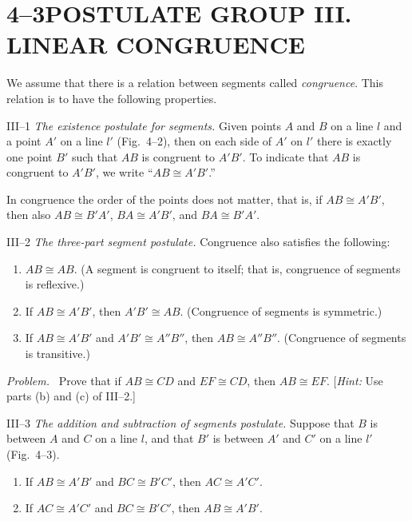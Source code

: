 \documentclass[11pt]{book}
\newenvironment{IVproblem}{\par\medskip\noindent\emph{Problem.}\ }{\par\medskip}
\begin{document}
\section*{4--3\quad POSTULATE GROUP III. LINEAR CONGRUENCE}

We assume that there is a relation between segments called \emph{congruence}.
This relation is to have the following properties.

III--1 \emph{The existence postulate for segments.} Given points $A$ and $B$ on a
line $l$ and a point $A'$ on a line $l'$ (Fig.~4--2), then on each side of $A'$
on $l'$ there is exactly one point $B'$ such that $AB$ is congruent to $A'B'$. To
indicate that $AB$ is congruent to $A'B'$, we write ``$AB \cong A'B'$.''

\FIGIVTWOTHREE

In congruence the order of the points does not matter, that is, if
$AB \cong A'B'$, then also $AB \cong B'A'$, $BA \cong A'B'$, and
$BA \cong B'A'$.

III--2 \emph{The three-part segment postulate.} Congruence also satisfies the
following:

\begin{enumerate}[label=(\alph*), leftmargin=2.2em, itemsep=2pt, topsep=3pt]
\item $AB \cong AB$. (A segment is congruent to itself; that is, congruence of
      segments is reflexive.)
\item If $AB \cong A'B'$, then $A'B' \cong AB$. (Congruence of segments is
      symmetric.)
\item If $AB \cong A'B'$ and $A'B' \cong A''B''$, then $AB \cong A''B''$.
      (Congruence of segments is transitive.)
\end{enumerate}

\begin{IVproblem}
Prove that if $AB \cong CD$ and $EF \cong CD$, then $AB \cong EF$.
[\emph{Hint:} Use parts (b) and (c) of III--2.]
\end{IVproblem}

III--3 \emph{The addition and subtraction of segments postulate.} Suppose that
$B$ is between $A$ and $C$ on a line $l$, and that $B'$ is between $A'$ and $C'$
on a line $l'$ (Fig.~4--3).

\begin{enumerate}[label=(\alph*), leftmargin=2.2em, itemsep=1pt, topsep=3pt]
\item If $AB \cong A'B'$ and $BC \cong B'C'$, then $AC \cong A'C'$.
\item If $AC \cong A'C'$ and $BC \cong B'C'$, then $AB \cong A'B'$.
\end{enumerate}
\end{document}
